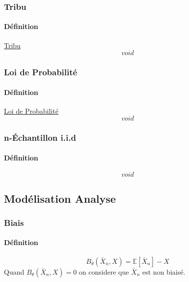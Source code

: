 \documentclass{article}
\begin{document}
\subsubsection{Tribu}
\paragraph{Définition} \href{https://fr.wikipedia.org/wiki/Tribu_(math%C3%A9matiques)}{Tribu}
\begin{equation}
    \boxed{
        void
    }
\end{equation}

\subsubsection{Loi de Probabilité}
\paragraph{Définition} \href{https://fr.wikipedia.org/wiki/Loi_de_probabilit%C3%A9}{Loi de Probabilité}
\begin{equation}
    \boxed{
        void
    }
\end{equation}

\subsubsection{n-Échantillon i.i.d}
\paragraph{Définition}
\begin{equation}
    \boxed{
        void
    }
\end{equation}

\subsection{Modélisation Analyse}
\subsubsection{Biais}
\paragraph{Définition}
\begin{equation}
    \boxed{
        B_{\theta}(\bar{X}_{n}, X) = \mathbb{E}[\bar{X}_{n}] - X
    }
\end{equation}
Quand $B_{\theta}(\bar{X}_{n}, X) = 0$ on considere que $\bar{X}_{n}$ est non biaisé.
\end{document}
